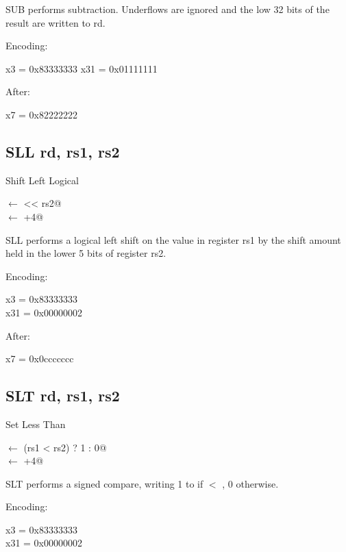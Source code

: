 SUB performs subtraction. Underflows are ignored and the low 32 bits of 
the result are written to rd.~\cite[p.~15]{rvismv1v22:2017}

Encoding:


x3  = 0x83333333
x31 = 0x01111111

After:

x7 = 0x82222222


\subsection{SLL rd, rs1, rs2}

Shift Left Logical

\verb@rd@ $\leftarrow$  << rs2@\\
\verb@pc@ $\leftarrow$ \verb@pc+4@

SLL performs a logical left shift on the value in register rs1 by 
the shift amount held in the lower 5 bits of register rs2.~\cite[p.~15]{rvismv1v22:2017}

Encoding:


x3  = 0x83333333\\
x31 = 0x00000002

After:

x7 = 0x0ccccccc


\subsection{SLT rd, rs1, rs2}

Set Less Than

\verb@rd@ $\leftarrow$ \verb@(rs1 < rs2) ? 1 : 0@\\
\verb@pc@ $\leftarrow$ \verb@pc+4@

SLT performs a signed compare, writing 1 to  if  $<$ , 0 
otherwise.~\cite[p.~15]{rvismv1v22:2017}

Encoding:


x3  = 0x83333333\\
x31 = 0x00000002

